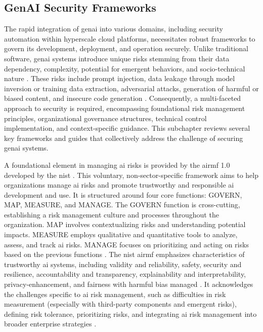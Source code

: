 
\subsection{GenAI Security Frameworks}
\label{sec:GenAI Security Frameworks}

The rapid integration of \gls{genai} into various domains, including security automation within hyperscale cloud platforms, necessitates robust frameworks to govern its development, deployment, and operation securely. Unlike traditional software, \gls{genai} systems introduce unique risks stemming from their data dependency, complexity, potential for emergent behaviors, and socio-technical nature \cite{tabassi_artificial_2023}. These risks include prompt injection, data leakage through model inversion or training data extraction, adversarial attacks, generation of harmful or biased content, and insecure code generation \cite{haryanto_secgenai_2024, hansen_introducing_2023}. Consequently, a multi-faceted approach to security is required, encompassing foundational risk management principles, organizational governance structures, technical control implementation, and context-specific guidance. This subchapter reviews several key frameworks and guides that collectively address the challenge of securing \gls{genai} systems.

A foundational element in managing \gls{ai} risks is provided by the \gls{airmf} 1.0 developed by the \gls{nist} \cite{tabassi_artificial_2023}. This voluntary, non-sector-specific framework aims to help organizations manage \gls{ai} risks and promote trustworthy and responsible \gls{ai} development and use. It is structured around four core functions: GOVERN, MAP, MEASURE, and MANAGE. The GOVERN function is cross-cutting, establishing a risk management culture and processes throughout the organization. MAP involves contextualizing risks and understanding potential impacts. MEASURE employs qualitative and quantitative tools to analyze, assess, and track \gls{ai} risks. MANAGE focuses on prioritizing and acting on risks based on the previous functions \cite{tabassi_artificial_2023}. The \gls{nist} \gls{airmf} emphasizes characteristics of trustworthy \gls{ai} systems, including validity and reliability, safety, security and resilience, accountability and transparency, explainability and interpretability, privacy-enhancement, and fairness with harmful bias managed \cite{tabassi_artificial_2023}. It acknowledges the challenges specific to \gls{ai} risk management, such as difficulties in risk measurement (especially with third-party components and emergent risks), defining risk tolerance, prioritizing risks, and integrating \gls{ai} risk management into broader enterprise strategies \cite{tabassi_artificial_2023}.

